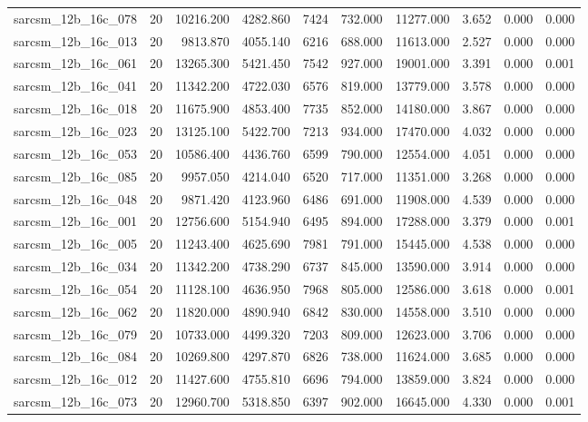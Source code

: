 \begin{tabular}{lrrrrrrrrr}
sarcsm\_12b\_16c\_078 & 20 & 10216.200 & 4282.860 & 7424 & 732.000 & 11277.000 & 3.652 & 0.000 & 0.000 \\
sarcsm\_12b\_16c\_013 & 20 & 9813.870 & 4055.140 & 6216 & 688.000 & 11613.000 & 2.527 & 0.000 & 0.000 \\
sarcsm\_12b\_16c\_061 & 20 & 13265.300 & 5421.450 & 7542 & 927.000 & 19001.000 & 3.391 & 0.000 & 0.001 \\
sarcsm\_12b\_16c\_041 & 20 & 11342.200 & 4722.030 & 6576 & 819.000 & 13779.000 & 3.578 & 0.000 & 0.000 \\
sarcsm\_12b\_16c\_018 & 20 & 11675.900 & 4853.400 & 7735 & 852.000 & 14180.000 & 3.867 & 0.000 & 0.000 \\
sarcsm\_12b\_16c\_023 & 20 & 13125.100 & 5422.700 & 7213 & 934.000 & 17470.000 & 4.032 & 0.000 & 0.000 \\
sarcsm\_12b\_16c\_053 & 20 & 10586.400 & 4436.760 & 6599 & 790.000 & 12554.000 & 4.051 & 0.000 & 0.000 \\
sarcsm\_12b\_16c\_085 & 20 & 9957.050 & 4214.040 & 6520 & 717.000 & 11351.000 & 3.268 & 0.000 & 0.000 \\
sarcsm\_12b\_16c\_048 & 20 & 9871.420 & 4123.960 & 6486 & 691.000 & 11908.000 & 4.539 & 0.000 & 0.000 \\
sarcsm\_12b\_16c\_001 & 20 & 12756.600 & 5154.940 & 6495 & 894.000 & 17288.000 & 3.379 & 0.000 & 0.001 \\
sarcsm\_12b\_16c\_005 & 20 & 11243.400 & 4625.690 & 7981 & 791.000 & 15445.000 & 4.538 & 0.000 & 0.000 \\
sarcsm\_12b\_16c\_034 & 20 & 11342.200 & 4738.290 & 6737 & 845.000 & 13590.000 & 3.914 & 0.000 & 0.000 \\
sarcsm\_12b\_16c\_054 & 20 & 11128.100 & 4636.950 & 7968 & 805.000 & 12586.000 & 3.618 & 0.000 & 0.001 \\
sarcsm\_12b\_16c\_062 & 20 & 11820.000 & 4890.940 & 6842 & 830.000 & 14558.000 & 3.510 & 0.000 & 0.000 \\
sarcsm\_12b\_16c\_079 & 20 & 10733.000 & 4499.320 & 7203 & 809.000 & 12623.000 & 3.706 & 0.000 & 0.000 \\
sarcsm\_12b\_16c\_084 & 20 & 10269.800 & 4297.870 & 6826 & 738.000 & 11624.000 & 3.685 & 0.000 & 0.000 \\
sarcsm\_12b\_16c\_012 & 20 & 11427.600 & 4755.810 & 6696 & 794.000 & 13859.000 & 3.824 & 0.000 & 0.000 \\
sarcsm\_12b\_16c\_073 & 20 & 12960.700 & 5318.850 & 6397 & 902.000 & 16645.000 & 4.330 & 0.000 & 0.001 \\

\end{tabular}
